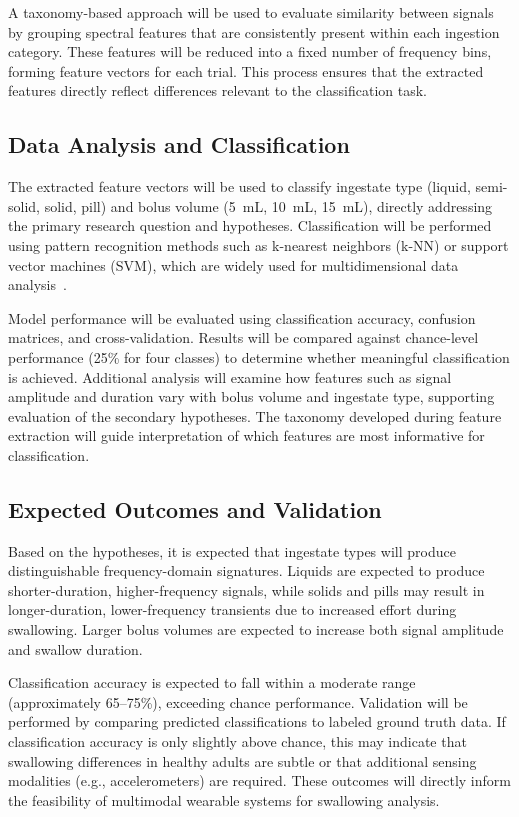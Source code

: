 \documentclass[10pt,conference]{IEEEtran}
\begin{document}
A taxonomy-based approach will be used to evaluate similarity between signals by grouping spectral features that are consistently present within each ingestion category. These features will be reduced into a fixed number of frequency bins, forming feature vectors for each trial. This process ensures that the extracted features directly reflect differences relevant to the classification task.

\subsection{Data Analysis and Classification}
The extracted feature vectors will be used to classify ingestate type (liquid, semi-solid, solid, pill) and bolus volume (5~mL, 10~mL, 15~mL), directly addressing the primary research question and hypotheses. Classification will be performed using pattern recognition methods such as k-nearest neighbors (k-NN) or support vector machines (SVM), which are widely used for multidimensional data analysis~\cite{bishop}.

Model performance will be evaluated using classification accuracy, confusion matrices, and cross-validation. Results will be compared against chance-level performance (25\% for four classes) to determine whether meaningful classification is achieved. Additional analysis will examine how features such as signal amplitude and duration vary with bolus volume and ingestate type, supporting evaluation of the secondary hypotheses. The taxonomy developed during feature extraction will guide interpretation of which features are most informative for classification.

\subsection{Expected Outcomes and Validation}
Based on the hypotheses, it is expected that ingestate types will produce distinguishable frequency-domain signatures. Liquids are expected to produce shorter-duration, higher-frequency signals, while solids and pills may result in longer-duration, lower-frequency transients due to increased effort during swallowing. Larger bolus volumes are expected to increase both signal amplitude and swallow duration.

Classification accuracy is expected to fall within a moderate range (approximately 65--75\%), exceeding chance performance. Validation will be performed by comparing predicted classifications to labeled ground truth data. If classification accuracy is only slightly above chance, this may indicate that swallowing differences in healthy adults are subtle or that additional sensing modalities (e.g., accelerometers) are required. These outcomes will directly inform the feasibility of multimodal wearable systems for swallowing analysis.

\printbibliography
\end{document}
